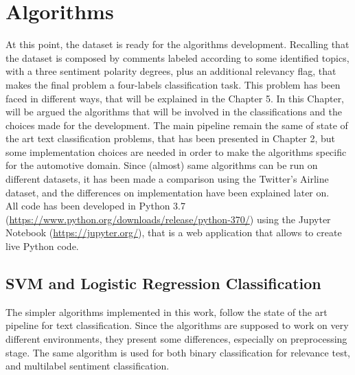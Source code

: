 
\chapter{Algorithms}
\label{algorithms}

At this point, the dataset is ready for the algorithms development. Recalling that the dataset is composed by comments labeled according to some identified topics, with a three sentiment polarity degrees, plus an additional relevancy flag, that makes the final problem a four-labels classification task. This problem has been faced in different ways, that will be explained in the Chapter 5. In this Chapter, will be argued the algorithms that will be involved in the classifications and the choices made for the development. The main pipeline remain the same of state of the art text classification problems, that has been presented in Chapter 2, but some implementation choices are needed in order to make the algorithms specific for the automotive domain. Since (almost) same algorithms can be run on different datasets, it has been made a comparison using the Twitter's Airline dataset, and the differences on implementation have been explained later on.\\
All code has been developed in Python 3.7 (\url{https://www.python.org/downloads/release/python-370/}) using the Jupyter Notebook (\url{https://jupyter.org/}), that is a web application that allows to create live Python code. 


\section{SVM and Logistic Regression Classification}

The simpler algorithms implemented in this work, follow the state of the art pipeline for text classification. Since the algorithms are supposed to work on very different environments, they present some differences, especially on preprocessing stage. The same algorithm is used for both binary classification for relevance test, and multilabel sentiment classification.\\


